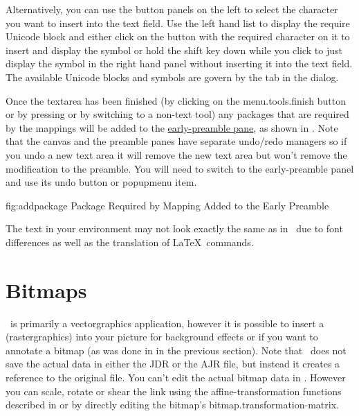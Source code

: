 Alternatively, you can use the button panels on the left to
select the character you want to insert into the text field. Use the
left hand list to display the require Unicode block and either click
on the button with the required character on it to insert and
display the symbol or hold the shift key down while you click to
just display the symbol in the right hand panel without inserting it
into the text field. The available Unicode blocks and symbols are govern by the
 tab in the  dialog.

Once the \gls{textarea} has been finished (by clicking on the
\gls{menu.tools.finish} button or by pressing
 or by switching to a non-text
tool) any packages that are required by the mappings will be added
to the \hyperref[sec:preamble]{early-preamble pane}, as shown in
.  Note that the \gls{canvas} and the
preamble panes have separate undo\slash redo managers so if you undo
a new text area it will remove the new text area but won't remove
the modification to the preamble. You will need to switch to the
early-preamble panel and use its undo button or \gls{popupmenu} item.

\FloatFig
  {fig:addpackage}
  {}
  {Package Required by Mapping Added to the Early Preamble}

\begin{important}
The text in your  environment may not
look exactly the same as in \FlowframTk\ due to font differences as
well as the translation of \LaTeX\ commands.
\end{important}


\chapter{Bitmaps}\label{sec:insertbitmap}


\FlowframTk\ is primarily a \gls{vectorgraphics} application,
however it is possible to insert a 
(\gls{rastergraphics}) into your picture for background effects or
if you want to annotate a \gls{bitmap} (as was done in
 in the previous section).  Note that
\FlowframTk\ does not save the actual  data in either
the \gls{JDR} or the \gls{AJR} file, but instead it creates a reference
to the original file. You can't edit the actual bitmap data in
\FlowframTk. However you can scale, rotate or shear the link
using the \gls{affine-transformation} functions described in 
 or by directly editing the
bitmap's \gls{bitmap.transformation-matrix}. 

